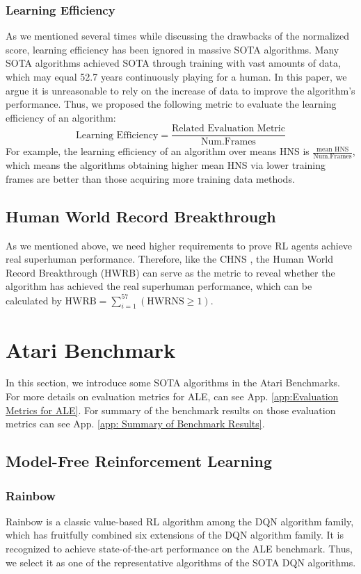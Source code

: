 \documentclass[nohyperref]{article}
\theoremstyle{plain}
\begin{document}
\subsubsection{Learning Efficiency}
As we mentioned several times while discussing the drawbacks of the normalized score, learning efficiency has been ignored in massive SOTA algorithms. Many SOTA algorithms achieved SOTA through training with vast amounts of data, which may equal 52.7 years continuously playing for a human. In this paper, we argue it is unreasonable to rely on the increase of data to improve the algorithm's performance. Thus, we proposed the following metric to evaluate the learning efficiency of an algorithm: 
\begin{equation}
    \text{Learning Efficiency}=\frac{\text{Related Evaluation Metric}}{\text{Num.Frames}}
\end{equation}
For example, the learning efficiency of an algorithm over means HNS is $\frac{\text{mean HNS}}{\text{Num.Frames}}$, which means the algorithms obtaining higher mean HNS via lower training frames are better than those acquiring more training data methods.
\subsection{Human World Record Breakthrough}
As we mentioned above, we need higher requirements to prove RL agents achieve real superhuman performance. Therefore, like the CHNS \citep{agent57}, the Human World Record Breakthrough (HWRB) can serve as the metric to reveal whether the algorithm has achieved the real superhuman performance, which can be calculated by $\text{HWRB} =\sum_{i=1}^{57}(\text{HWRNS} \geq 1) $.


\clearpage
\section{Atari Benchmark}
\label{app: atari benchmark}

In this section, we introduce some SOTA algorithms in the Atari Benchmarks. For more details on evaluation metrics for ALE, can see App. \ref{app:Evaluation Metrics for ALE}. For summary of the benchmark results on those evaluation metrics can see App. \ref{app: Summary of Benchmark Results}. 


\subsection{Model-Free Reinforcement Learning}
\subsubsection{Rainbow}
Rainbow \citep{rainbow} is a classic value-based RL algorithm among the  DQN algorithm family, which has fruitfully combined six extensions of the DQN algorithm family. It is recognized to achieve state-of-the-art performance on the ALE benchmark. Thus, we select it as one of the representative algorithms of the SOTA DQN algorithms.
\end{document}
